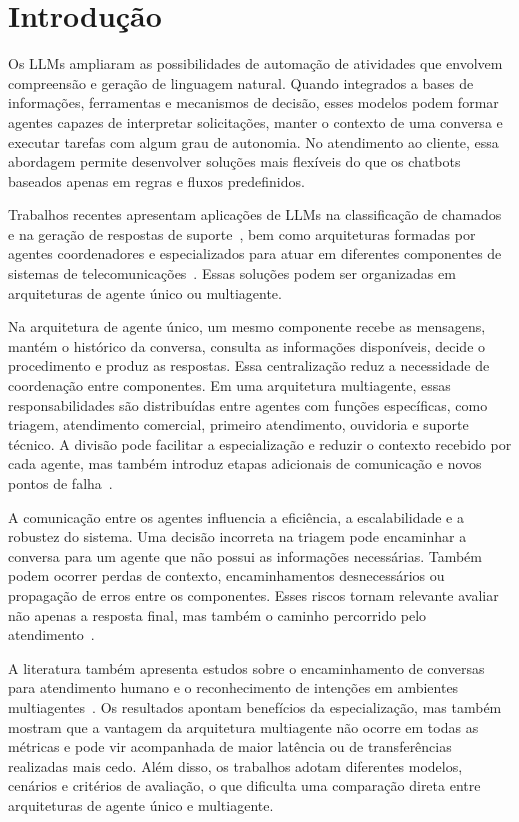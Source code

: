 \chapter{Introdução}\label{cap:introducao}

Os \glspl{LLM} ampliaram as possibilidades de automação de atividades que envolvem compreensão e geração de linguagem natural. Quando integrados a bases de informações, ferramentas e mecanismos de decisão, esses modelos podem formar agentes capazes de interpretar solicitações, manter o contexto de uma conversa e executar tarefas com algum grau de autonomia. No atendimento ao cliente, essa abordagem permite desenvolver soluções mais flexíveis do que os chatbots baseados apenas em regras e fluxos predefinidos.

Trabalhos recentes apresentam aplicações de LLMs na classificação de chamados e na geração de respostas de suporte~\cite{moncada2025}, bem como arquiteturas formadas por agentes coordenadores e especializados para atuar em diferentes componentes de sistemas de telecomunicações~\cite{lee2025}. Essas soluções podem ser organizadas em arquiteturas de agente único ou multiagente.

Na arquitetura de agente único, um mesmo componente recebe as mensagens, mantém o histórico da conversa, consulta as informações disponíveis, decide o procedimento e produz as respostas. Essa centralização reduz a necessidade de coordenação entre componentes. Em uma arquitetura multiagente, essas responsabilidades são distribuídas entre agentes com funções específicas, como triagem, atendimento comercial, primeiro atendimento, ouvidoria e suporte técnico. A divisão pode facilitar a especialização e reduzir o contexto recebido por cada agente, mas também introduz etapas adicionais de comunicação e novos pontos de falha~\cite{yan2026}.

A comunicação entre os agentes influencia a eficiência, a escalabilidade e a robustez do sistema. Uma decisão incorreta na triagem pode encaminhar a conversa para um agente que não possui as informações necessárias. Também podem ocorrer perdas de contexto, encaminhamentos desnecessários ou propagação de erros entre os componentes. Esses riscos tornam relevante avaliar não apenas a resposta final, mas também o caminho percorrido pelo atendimento~\cite{owotogbe2025}.

A literatura também apresenta estudos sobre o encaminhamento de conversas para atendimento humano e o reconhecimento de intenções em ambientes multiagentes~\cite{amri2026,yang2025}. Os resultados apontam benefícios da especialização, mas também mostram que a vantagem da arquitetura multiagente não ocorre em todas as métricas e pode vir acompanhada de maior latência ou de transferências realizadas mais cedo. Além disso, os trabalhos adotam diferentes modelos, cenários e critérios de avaliação, o que dificulta uma comparação direta entre arquiteturas de agente único e multiagente.

